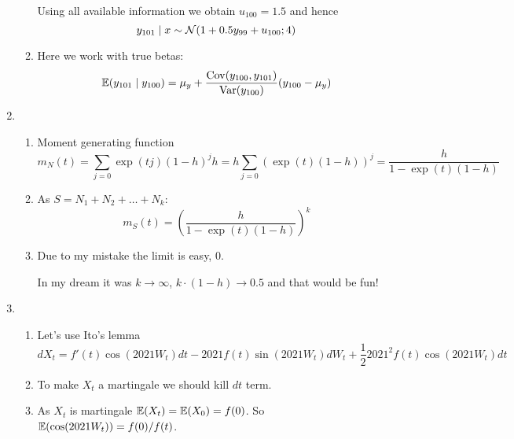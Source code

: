 \begin{enumerate}
\begin{enumerate}
    Using all available information we obtain $u_{100}  = 1.5$ and hence
    \[
    y_{101} \mid x \sim  \mathcal{N}(1 + 0.5 y_{99} + u_{100} ; 4)
    \]

    \item Here we work with true betas:
    \[
    \operatorname{\mathbb{E}}(y_{101} \mid y_{100}) = \mu_y + \frac{\operatorname{Cov}(y_{100}, y_{101})}{\operatorname{Var}(y_{100})}(y_{100} - \mu_y)    
    \]

\end{enumerate}
\item \begin{enumerate}
    \item Moment generating function
\[
m_N(t) = \sum_{j=0} \exp(tj) (1-h)^j h = h \sum_{j=0} (\exp(t) (1-h))^j = \frac{h}{1 - \exp(t) (1 - h)}  
\]
\item As $S = N_1 + N_2 + \ldots + N_k$:
\[
m_S(t) =  \left( \frac{h}{1 - \exp(t) (1 - h)} \right)^k
\]
\item Due to my mistake the limit is easy, $0$. 

In my dream it was $k\to \infty$, $k \cdot (1 - h) \to 0.5$ and that would be fun!

\end{enumerate}

\item \begin{enumerate}
    \item Let's use Ito's lemma
    \[
    dX_t = f'(t) \cos (2021 W_t) dt - 2021 f(t) \sin (2021 W_t) dW_t + \frac{1}{2}2021^2 f(t) \cos(2021 W_t) dt    
    \]
    \item To make $X_t$ a martingale we should kill $dt$ term. 
    \item As $X_t$ is martingale $\operatorname{\mathbb{E}}(X_t) = \operatorname{\mathbb{E}}(X_0) = f(0)$.
    So $\operatorname{\mathbb{E}}(\cos (2021 W_t)) = f(0) / f(t)$.
\end{enumerate}

\end{enumerate}




